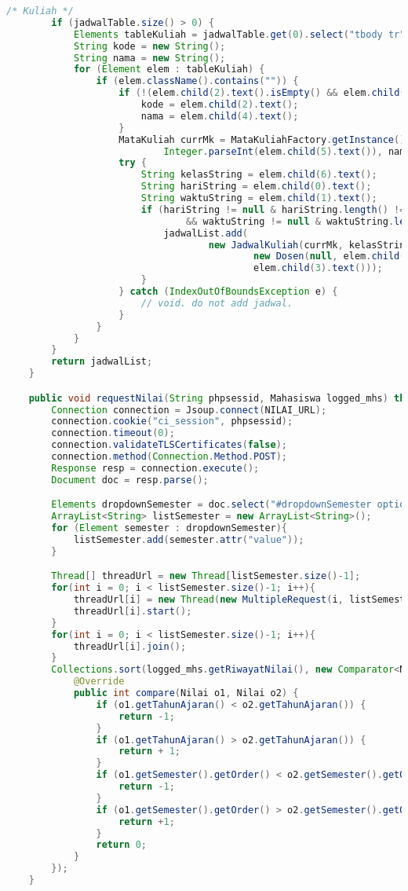 \begin{lstlisting}[language=Java,basicstyle=\tiny,caption=Scraper.java]
		/* Kuliah */
		if (jadwalTable.size() > 0) {
			Elements tableKuliah = jadwalTable.get(0).select("tbody tr");
			String kode = new String();
			String nama = new String();
			for (Element elem : tableKuliah) {
				if (elem.className().contains("")) {
					if (!(elem.child(2).text().isEmpty() && elem.child(4).text().isEmpty())) {
						kode = elem.child(2).text();
						nama = elem.child(4).text();
					}
					MataKuliah currMk = MataKuliahFactory.getInstance().createMataKuliah(kode,
							Integer.parseInt(elem.child(5).text()), nama);
					try {
						String kelasString = elem.child(6).text();
						String hariString = elem.child(0).text();
						String waktuString = elem.child(1).text();
						if (hariString != null & hariString.length() != 0
								&& waktuString != null & waktuString.length() != 0) {
							jadwalList.add(
									new JadwalKuliah(currMk, kelasString.length() == 0 ? null : kelasString.charAt(0),
											new Dosen(null, elem.child(7).text()), hariString, waktuString,
											elem.child(3).text()));
						}
					} catch (IndexOutOfBoundsException e) {
						// void. do not add jadwal.
					}
				}
			}
		}
		return jadwalList;
	}

	public void requestNilai(String phpsessid, Mahasiswa logged_mhs) throws IOException, InterruptedException {
		Connection connection = Jsoup.connect(NILAI_URL);
		connection.cookie("ci_session", phpsessid);
		connection.timeout(0);
		connection.validateTLSCertificates(false);
		connection.method(Connection.Method.POST);
		Response resp = connection.execute();
		Document doc = resp.parse();

		Elements dropdownSemester = doc.select("#dropdownSemester option");
		ArrayList<String> listSemester = new ArrayList<String>();
		for (Element semester : dropdownSemester){
			listSemester.add(semester.attr("value"));
		}

		Thread[] threadUrl = new Thread[listSemester.size()-1];
		for(int i = 0; i < listSemester.size()-1; i++){
			threadUrl[i] = new Thread(new MultipleRequest(i, listSemester, NILAI_URL, phpsessid, logged_mhs));
			threadUrl[i].start();
		}
		for(int i = 0; i < listSemester.size()-1; i++){
			threadUrl[i].join();
		}
		Collections.sort(logged_mhs.getRiwayatNilai(), new Comparator<Nilai>() {
			@Override
			public int compare(Nilai o1, Nilai o2) {
				if (o1.getTahunAjaran() < o2.getTahunAjaran()) {
					return -1;
				}
				if (o1.getTahunAjaran() > o2.getTahunAjaran()) {
					return + 1;
				}
				if (o1.getSemester().getOrder() < o2.getSemester().getOrder()) {
					return -1;
				}
				if (o1.getSemester().getOrder() > o2.getSemester().getOrder()) {
					return +1;
				}
				return 0;
			}
		});
	}


\end{lstlisting}
